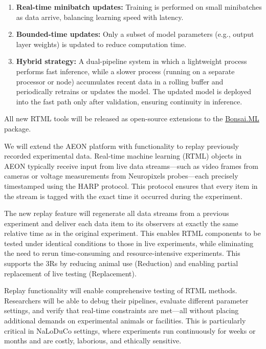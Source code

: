\begin{enumerate}

	\item\textbf{Real-time minibatch updates:} Training is performed on small
	minibatches as data arrive, balancing learning speed with latency.

	\item\textbf{Bounded-time updates:} Only a subset of model parameters
	(e.g., output layer weights) is updated to reduce computation time.

	\item\textbf{Hybrid strategy:} A dual-pipeline system in which a
	lightweight process performs fast inference, while a slower process
	(running on a separate processor or node) accumulates recent data in a
	rolling buffer and periodically retrains or updates the model. The updated
	model is deployed into the fast path only after validation, ensuring
	continuity in inference.

\end{enumerate}

All new RTML tools will be released as open-source extensions to the
\href{https://bonsai-rx.org/machinelearning/}{Bonsai.ML} package.


We will extend the AEON platform with functionality to replay previously
recorded experimental data. Real-time machine learning (RTML) objects in AEON
typically receive input from live data streams—such as video frames from
cameras or voltage measurements from Neuropixels probes—each precisely
timestamped using the HARP protocol. This protocol ensures that every item in
the stream is tagged with the exact time it occurred during the experiment.

The new replay feature will regenerate all data streams from a previous
experiment and deliver each data item to its observers at exactly the same
relative time as in the original experiment. This enables RTML components to be
tested under identical conditions to those in live experiments, while
eliminating the need to rerun time-consuming and resource-intensive
experiments. This supports the 3Rs by reducing animal use (Reduction) and
enabling partial replacement of live testing (Replacement).

Replay functionality will enable comprehensive testing of RTML methods.
Researchers will be able to debug their pipelines, evaluate different parameter
settings, and verify that real-time constraints are met—all without placing
additional demands on experimental animals or facilities. This is particularly
critical in NaLoDuCo settings, where experiments run continuously for weeks or
months and are costly, laborious, and ethically sensitive.


